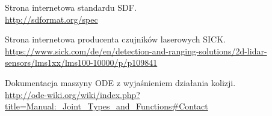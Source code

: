 \begin{thebibliography}{0}
Strona internetowa standardu SDF. \\
\url{http://sdformat.org/spec}

Strona internetowa producenta czujników laserowych SICK. \\
\url{https://www.sick.com/de/en/detection-and-ranging-solutions/2d-lidar-sensors/lms1xx/lms100-10000/p/p109841}

Dokumentacja maszyny ODE z wyjaśnieniem działania kolizji. \\
\url{http://ode-wiki.org/wiki/index.php?title=Manual:_Joint_Types_and_Functions#Contact}

\end{thebibliography}

